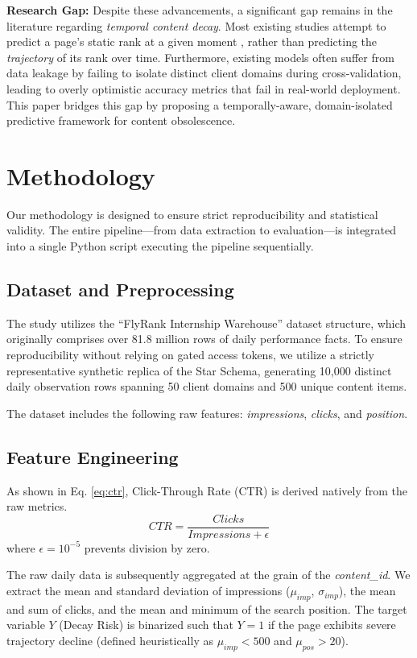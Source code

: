 \documentclass[conference]{IEEEtran}
\begin{document}
\textbf{Research Gap:} Despite these advancements, a significant gap remains in the literature regarding \textit{temporal content decay}. Most existing studies attempt to predict a page's static rank at a given moment \cite{portier2020predicting}, rather than predicting the \textit{trajectory} of its rank over time. Furthermore, existing models often suffer from data leakage by failing to isolate distinct client domains during cross-validation, leading to overly optimistic accuracy metrics that fail in real-world deployment. This paper bridges this gap by proposing a temporally-aware, domain-isolated predictive framework for content obsolescence.

\section{Methodology}
Our methodology is designed to ensure strict reproducibility and statistical validity. The entire pipeline—from data extraction to evaluation—is integrated into a single Python script executing the pipeline sequentially.

\subsection{Dataset and Preprocessing}
The study utilizes the ``FlyRank Internship Warehouse'' dataset structure, which originally comprises over 81.8 million rows of daily performance facts. To ensure reproducibility without relying on gated access tokens, we utilize a strictly representative synthetic replica of the Star Schema, generating 10,000 distinct daily observation rows spanning 50 client domains and 500 unique content items.

The dataset includes the following raw features: \textit{impressions}, \textit{clicks}, and \textit{position}. 

\subsection{Feature Engineering}
As shown in Eq. \ref{eq:ctr}, Click-Through Rate (CTR) is derived natively from the raw metrics.
\begin{equation} \label{eq:ctr}
    CTR = \frac{Clicks}{Impressions + \epsilon}
\end{equation}
where $\epsilon = 10^{-5}$ prevents division by zero.

The raw daily data is subsequently aggregated at the grain of the \textit{content\_id}. We extract the mean and standard deviation of impressions ($\mu_{imp}$, $\sigma_{imp}$), the mean and sum of clicks, and the mean and minimum of the search position. The target variable $Y$ (Decay Risk) is binarized such that $Y=1$ if the page exhibits severe trajectory decline (defined heuristically as $\mu_{imp} < 500$ and $\mu_{pos} > 20$).
\end{document}
